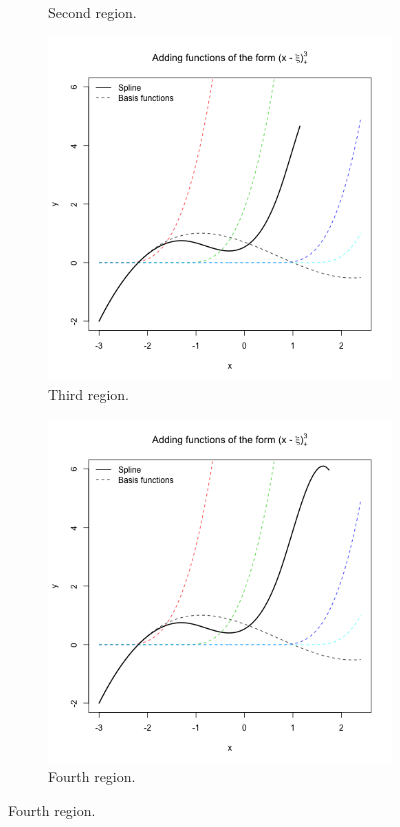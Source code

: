 \documentclass[12pt, letterpaper]{article}
\theoremstyle{definition}
\begin{document}
\begin{figure}
\begin{subfigure}{0.49\textwidth}
\caption{Second region.}
\end{subfigure}
\begin{subfigure}{0.49\textwidth}
\centering
\includegraphics[width=1\linewidth]{img/spline_cubic/77}
\caption{Third region.}
\end{subfigure}
\hfill
\begin{subfigure}{0.49\textwidth}
\centering
\includegraphics[width=1\linewidth]{img/spline_cubic/88}
\caption{Fourth region.}
\end{subfigure}
\end{figure}
\end{document}
